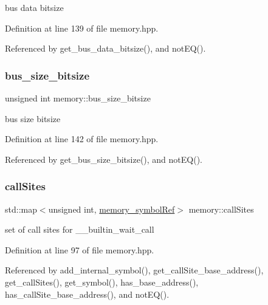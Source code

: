 bus data bitsize 



Definition at line 139 of file memory.\+hpp.



Referenced by get\+\_\+bus\+\_\+data\+\_\+bitsize(), and not\+E\+Q().

\mbox{\label{classmemory_adb91a01d972a23757d764578d6b36f7e}} 
\subsubsection{\texorpdfstring{bus\+\_\+size\+\_\+bitsize}{bus\_size\_bitsize}}
{\footnotesize\ttfamily unsigned int memory\+::bus\+\_\+size\+\_\+bitsize\hspace{0.3cm}{\ttfamily [private]}}



bus size bitsize 



Definition at line 142 of file memory.\+hpp.



Referenced by get\+\_\+bus\+\_\+size\+\_\+bitsize(), and not\+E\+Q().

\mbox{\label{classmemory_ae8e4d74f0178f58f58d3a2e4432c1cd7}} 
\subsubsection{\texorpdfstring{call\+Sites}{callSites}}
{\footnotesize\ttfamily std\+::map$<$unsigned int, \hyperlink{memory__symbol_8hpp_af3608dbc27177447c2d777fa712cc82a}{memory\+\_\+symbol\+Ref}$>$ memory\+::call\+Sites\hspace{0.3cm}{\ttfamily [private]}}



set of call sites for \+\_\+\+\_\+builtin\+\_\+wait\+\_\+call 



Definition at line 97 of file memory.\+hpp.



Referenced by add\+\_\+internal\+\_\+symbol(), get\+\_\+call\+Site\+\_\+base\+\_\+address(), get\+\_\+call\+Sites(), get\+\_\+symbol(), has\+\_\+base\+\_\+address(), has\+\_\+call\+Site\+\_\+base\+\_\+address(), and not\+E\+Q().

